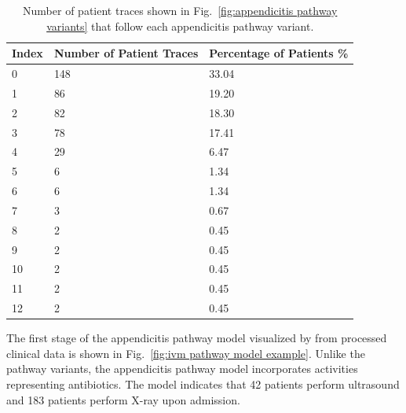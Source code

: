 \begin{table}[t]
\centering
\caption{Number of patient traces shown in Fig.~\ref{fig:appendicitis pathway variants} that follow each appendicitis pathway variant.}
\label{table:appendicitis variant table}
\begin{tabular}{ l l l }
 \hline
 \hline
 Index & Number of Patient Traces & Percentage of Patients \% \\ 
 \hline
 0 & 148 & 33.04\\ 
 1 & 86 & 19.20\\ 
 2 & 82 & 18.30\\ 
 3 & 78 & 17.41\\ 
 4 & 29 & 6.47\\ 
 5 & 6 & 1.34\\
 6 & 6 & 1.34\\ 
 7 & 3 & 0.67\\ 
 8 & 2 & 0.45\\ 
 9 & 2 & 0.45\\ 
 10 & 2 & 0.45\\ 
 11 & 2 & 0.45\\ 
 12 & 2 & 0.45\\ 
 \hline
 \hline
\end{tabular}
\end{table}


The first stage of the appendicitis pathway model visualized by  from processed clinical data is shown in Fig.~\ref{fig:ivm pathway model example}. Unlike the pathway variants, the appendicitis pathway model incorporates activities representing antibiotics. The model indicates that 42 patients perform ultrasound and 183 patients perform X-ray upon admission. 

